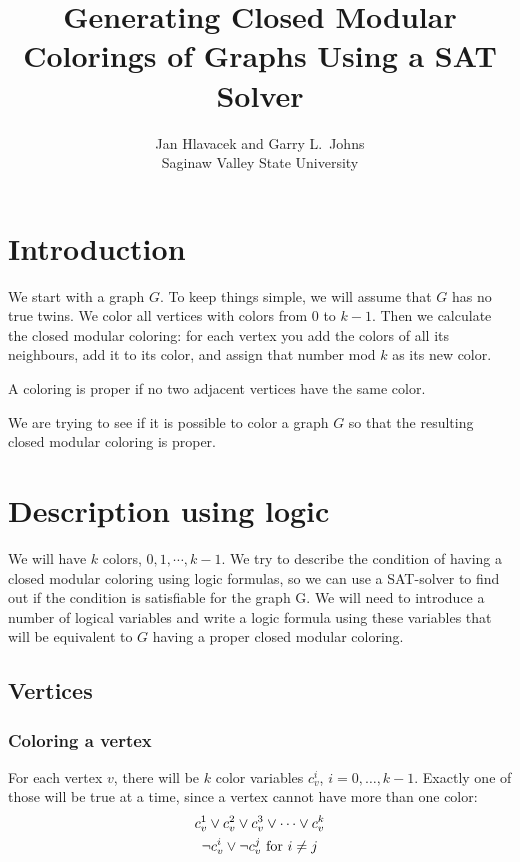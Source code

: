 \documentclass[letterpaper]{article}
\title{Generating Closed Modular Colorings of Graphs Using a SAT Solver}
\author{Jan Hlavacek and Garry L.~Johns\\Saginaw Valley State University}
\let\vel\vee
\begin{document}
\maketitle
\section{Introduction}
We start with a graph $G$.  To keep things simple, we will assume
that $G$ has no true twins.  We color all vertices with colors from $0$ to $k-1$.  Then we
calculate the closed modular coloring:  for each vertex you add the colors of
all its neighbours, add it to its color, and assign that number mod $k$ as its
new color. 

A coloring is proper if no two adjacent vertices have the same color. 

We are trying to see if it is possible to color a graph $G$ so that the
resulting closed modular coloring is proper. 

\section{Description using logic}

We will have $k$ colors, $0,1,\cdots,k-1$.  We try to describe the condition of
having a closed modular coloring using logic formulas, so we can
use a SAT-solver to find out if the condition is satisfiable for
the graph G. We will need to introduce a number of logical
variables and write a logic formula using these variables that
will be equivalent to $G$ having a proper closed modular coloring.

\subsection{Vertices}

\subsubsection{Coloring a vertex}

For each vertex $v$, there will be $k$ color variables $c_v^i$, $i =
0,\dots,k-1$.  Exactly one of those will be true at a time, since a vertex cannot
have more than one color:
\begin{gather}
   c_v^1 \vel c_v^2 \vel c_v^3 \vel \dots \vel c_v^k \label{eq:colors1}\\
   \neg c_v^i \vel \neg c_v^j \text{ for $i \neq j$\label{eq:colors2}}
\end{gather}
\end{document}
